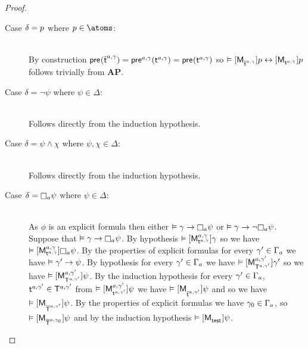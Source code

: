\begin{proof}
\begin{enumerate}
        \begin{description}
            \item[Case $\delta = \atomP$ where $\atomP \in \atoms$:] \hfill\\
                By construction $\aPrecondition(\aPStateT[\agentA, \gamma]) = \aPrecondition[\agentA, \gamma](\aStateT[\agentA, \gamma]) = \aPrecondition(\aStateT[\agentA, \gamma])$ so $\entails \actionA{\aPModel{\aPStateT[\agentA, \gamma]}} \atomP \iff \actionA{\aPModel{\aStateT[\agentA, \gamma]}} \atomP$ follows trivially from {\bf AP}.
            \item[Case $\delta = \lnot \psi$ where $\psi \in \Delta$:] \hfill\\
                Follows directly from the induction hypothesis.
            \item[Case $\delta = \psi \land \chi$ where $\psi, \chi \in \Delta$:] \hfill\\
                Follows directly from the induction hypothesis.
            \item[Case $\delta = \necessaryA \psi$ where $\psi \in \Delta$:] \hfill\\
                As $\phi$ is an explicit formula then either $\entails \gamma \implies \necessaryA \psi$ or $\entails \gamma \implies \lnot \necessaryA \psi$.
                Suppose that $\entails \gamma \implies \necessaryA \psi$.
                By hypothesis $\entails \actionA{\aPModel[\agentA, \gamma]{\aStateT[\agentA, \gamma]}} \gamma$ so we have $\entails \actionA{\aPModel[\agentA, \gamma]{\aStateT[\agentA, \gamma]}} \necessaryA \psi$.
                By the properties of explicit formulas for every $\gamma' \in \Gamma_\agentA$ we have $\entails \gamma' \implies \psi$.
                By hypothesis for every $\gamma' \in \Gamma_\agentA$ we have $\entails \actionA{\aPModel[\agentA, \gamma']{\aStatesT[\agentA, \gamma']}} \gamma'$ so we have $\entails \actionA{\aPModel[\agentA, \gamma']{\aStatesT[\agentA, \gamma']}} \psi$.
                By the induction hypothesis for every $\gamma' \in \Gamma_\agentA$, $\aStateT[\agentA, \gamma'] \in \aStatesT[\agentA, \gamma']$ from
                $\entails \actionA{\aPModel[\agentA, \gamma']{\aStateT[\agentA, \gamma']}} \psi$ we have
                $\entails \actionA{\aPModel{\aPStateT[\agentA, \gamma']}} \psi$ and so we have
                $\entails \actionA{\aPModel{\aPStatesT[\agentA, \gamma']}} \psi$.
                By the properties of explicit formulas we have $\gamma_0 \in \Gamma_\agentA$, so $\entails \actionA{\aPModel{\aPStatesT[\agentA, \gamma_0]}} \psi$ and by the induction hypothesis $\entails \actionA{\aPModel{\aStateTest}} \psi$.

\end{description}
\end{enumerate}
\end{proof}
